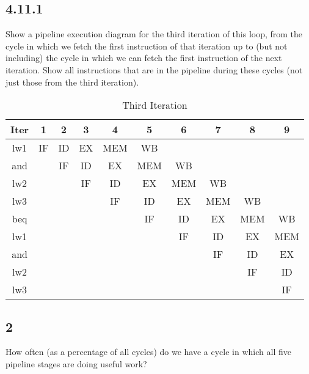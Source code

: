 \documentclass[paper=a4, fontsize=11pt]{scrartcl} %
\begin{document}
\subsection{4.11.1}
\begin{fancyquotes}
    Show a pipeline execution diagram for the third iteration of this loop, from the cycle in which we fetch the first instruction of that iteration up to (but not including) the cycle in which we can fetch the first instruction of the next iteration. Show all instructions that are in the pipeline during these cycles (not just those from the third iteration).
\end{fancyquotes}

\begin{table}[hp]
    \caption{Third Iteration}\label{tab:iteration}
    \begin{center}
        \begin{tabular}{cccccccccc}
        \toprule
        \textbf{Iter} & \textbf{1} & \textbf{2} & \textbf{3} & \textbf{4} & \textbf{5}
        & \textbf{6} & \textbf{7} & \textbf{8} & \textbf{9}\\
        \midrule
        lw1 & IF & ID & EX & MEM & WB &    &    &    & \\
        and &    & IF & ID & EX & MEM & WB &    &    & \\
        lw2 &    &    & IF & ID & EX & MEM & WB &    & \\
        lw3 &    &    &    & IF & ID & EX & MEM & WB & \\
        beq &    &    &    &    & IF & ID & EX & MEM & WB \\
        lw1 &    &    &    &    &    & IF & ID & EX & MEM \\
        and &    &    &    &    &    &    & IF & ID & EX \\
        lw2 &    &    &    &    &    &    &    & IF & ID \\
        lw3 &    &    &    &    &    &    &    &    & IF \\
        \bottomrule
        \end{tabular}
    \end{center}
\end{table}

\subsection{2}
\begin{fancyquotes}
    How often (as a percentage of all cycles) do we have a cycle in which all five pipeline stages are doing useful work?
\end{fancyquotes}
\end{document}
